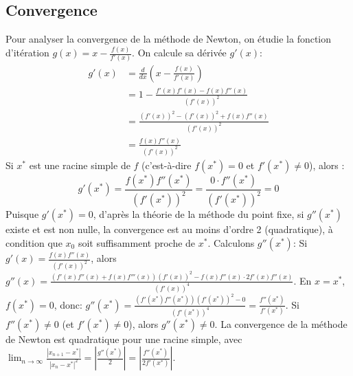\subsection{Convergence}
\label{ssec:newton_convergence}
Pour analyser la convergence de la méthode de Newton, on étudie la fonction d'itération $g(x) = x - \frac{f(x)}{f'(x)}$.
On calcule sa dérivée $g'(x)$:
\begin{align*}
g'(x) &= \frac{d}{dx} \left( x - \frac{f(x)}{f'(x)} \right) \\
&= 1 - \frac{f'(x)f'(x) - f(x)f''(x)}{(f'(x))^2} \\
&= \frac{(f'(x))^2 - (f'(x))^2 + f(x)f''(x)}{(f'(x))^2} \\
&= \frac{f(x)f''(x)}{(f'(x))^2}
\end{align*}
Si $x^*$ est une racine simple de $f$ (c'est-à-dire $f(x^*) = 0$ et $f'(x^*) \neq 0$), alors :
$$ g'(x^*) = \frac{f(x^*)f''(x^*)}{(f'(x^*))^2} = \frac{0 \cdot f''(x^*)}{(f'(x^*))^2} = 0 $$
Puisque $g'(x^*) = 0$, d'après la théorie de la méthode du point fixe, si $g''(x^*)$ existe et est non nulle, la convergence est au moins d'ordre 2 (quadratique), à condition que $x_0$ soit suffisamment proche de $x^*$.
Calculons $g''(x^*)$:
Si $g'(x) = \frac{f(x)f''(x)}{(f'(x))^2}$, alors
$g''(x) = \frac{(f'(x)f''(x)+f(x)f'''(x))(f'(x))^2 - f(x)f''(x) \cdot 2 f'(x)f''(x)}{(f'(x))^4}$.
En $x=x^*$, $f(x^*)=0$, donc:
$g''(x^*) = \frac{(f'(x^*)f''(x^*))(f'(x^*))^2 - 0}{(f'(x^*))^4} = \frac{f''(x^*)}{f'(x^*)}$.
Si $f''(x^*) \neq 0$ (et $f'(x^*) \neq 0$), alors $g''(x^*) \neq 0$.
La convergence de la méthode de Newton est quadratique pour une racine simple, avec $\lim_{n \to \infty} \frac{|x_{n+1}-x^*|}{|x_n-x^*|^2} = \left|\frac{g''(x^*)}{2}\right| = \left|\frac{f''(x^*)}{2f'(x^*)}\right|$.

